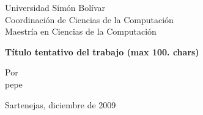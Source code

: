 \begin{titlepage}

\begin{flushleft}
\textsf{
Universidad Simón Bolívar \\
Coordinación de Ciencias de la Computación \\
Maestría en Ciencias de la Computación \\
}
\end{flushleft}

\begin{center}

{\large \bf \textsf{Título tentativo del trabajo (max 100. chars)}}

\end{center}

\vspace{5.0cm}

\textsf{
Por \\
pepe \\
}

\vspace{\fill}

\vspace{\fill}

\vspace{1.0cm}
\textsf{Sartenejas, diciembre de 2009}

\end{titlepage}
